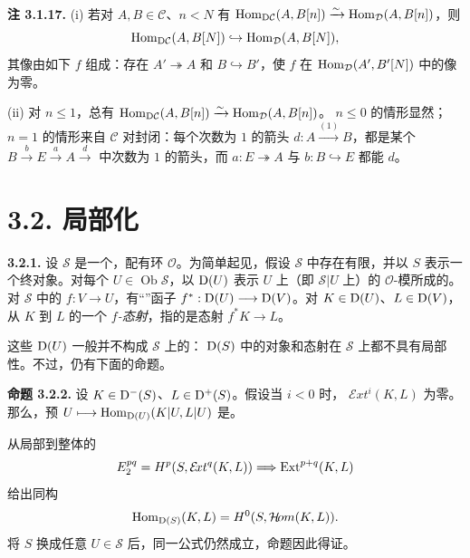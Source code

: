 \par\medskip\noindent\textbf{注 3.1.17.}
(i) 若对 $A,B\in\mathcal C$、$n<N$ 有
$\operatorname{Hom}_{\mathrm{D}\mathcal C}(A,B[n])\xrightarrow{\sim}\operatorname{Hom}_{\mathcal D}(A,B[n])$，则
\[
\operatorname{Hom}_{\mathrm{D}\mathcal C}(A,B[N])\hookrightarrow\operatorname{Hom}_{\mathcal D}(A,B[N]),
\]
其像由如下 $f$ 组成：存在 $A'\twoheadrightarrow A$ 和 $B\hookrightarrow B'$，使 $f$ 在 $\operatorname{Hom}_{\mathcal D}(A',B'[N])$ 中的像为零。

(ii) 对 $n\leq1$，总有
$\operatorname{Hom}_{\mathrm{D}\mathcal C}(A,B[n])\xrightarrow{\sim}\operatorname{Hom}_{\mathcal D}(A,B[n])$。
$n\leq0$ 的情形显然；$n=1$ 的情形来自 $\mathcal C$ 对封闭：每个次数为 $1$ 的箭头 $d:A\xrightarrow{(1)}B$，都是某个
$B\xrightarrow{b}E\xrightarrow{a}A\xrightarrow{d}$
中次数为 $1$ 的箭头，而 $a:E\twoheadrightarrow A$ 与 $b:B\hookrightarrow E$ 都能 $d$。

\section*{3.2. 局部化}

\par\medskip\noindent\textbf{3.2.1.}
设 $\mathscr S$ 是一个，配有环 $\mathcal O$。为简单起见，假设 $\mathscr S$ 中存在有限，并以 $S$ 表示一个终对象。对每个 $U\in\operatorname{Ob}\mathscr S$，以 $\mathrm{D}(U)$ 表示 $U$ 上（即 $\mathscr S|U$ 上）的 $\mathcal O$-模所成的。对 $\mathscr S$ 中的 $f:V\longrightarrow U$，有“”函子
$f^*:\mathrm{D}(U)\longrightarrow\mathrm{D}(V)$。对 $K\in\mathrm{D}(U)$、$L\in\mathrm{D}(V)$，从 $K$ 到 $L$ 的一个 \emph{$f$-态射}，指的是态射 $f^*K\longrightarrow L$。

这些 $\mathrm{D}(U)$ 一般并不构成 $\mathscr S$ 上的： $\mathrm{D}(S)$ 中的对象和态射在 $\mathscr S$ 上都不具有局部性。不过，仍有下面的命题。

\par\medskip\noindent\textbf{命题 3.2.2.}
设 $K\in\mathrm{D}^-(S)$、$L\in\mathrm{D}^+(S)$。假设当 $i<0$ 时， $\mathcal E\!xt^i(K,L)$ 为零。那么，预
$U\longmapsto\operatorname{Hom}_{\mathrm{D}(U)}(K|U,L|U)$ 是。

从局部到整体的
\[
E_2^{pq}=H^p(S,\mathcal E\!xt^q(K,L))\Longrightarrow\operatorname{Ext}^{p+q}(K,L)
\]
给出同构
\[
\operatorname{Hom}_{\mathrm{D}(S)}(K,L)=H^0(S,\mathcal H\!om(K,L)).
\]
将 $S$ 换成任意 $U\in\mathscr S$ 后，同一公式仍然成立，命题因此得证。


